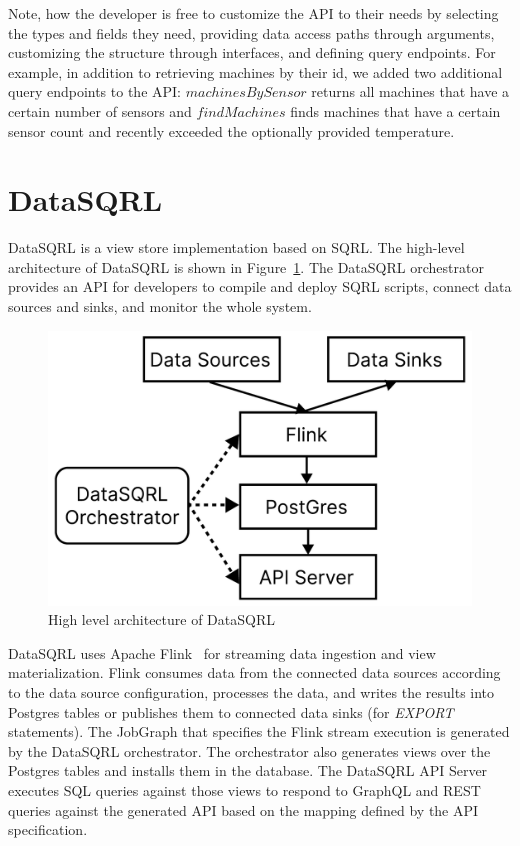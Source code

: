 \documentclass[	DIV=calc,%
							paper=letter,%
							fontsize=11pt,%
							twocolumn]{scrartcl}	 					%
\begin{document}
Note, how the developer is free to customize the API to their needs by selecting the types and fields they need, providing data access paths through arguments, customizing the structure through interfaces, and defining query endpoints. For example, in addition to retrieving machines by their id, we added two additional query endpoints to the API: $machinesBySensor$ returns all machines that have a certain number of sensors and $findMachines$ finds machines that have a certain sensor count and recently exceeded the optionally provided temperature.

\section{DataSQRL}
\label{sec:datasqrl}

DataSQRL is a view store implementation based on SQRL. The high-level architecture of DataSQRL is shown in Figure~\ref{fig:datasqrl_architecture}. The DataSQRL orchestrator provides an API for developers to compile and deploy SQRL scripts, connect data sources and sinks, and monitor the whole system.

\begin{figure}[h]
\includegraphics[width=\linewidth]{datasqrl_architecture.pdf}
\caption{High level architecture of DataSQRL}
\label{fig:datasqrl_architecture}
\end{figure}

DataSQRL uses Apache Flink~\cite{} for streaming data ingestion and view materialization. Flink consumes data from the connected data sources according to the data source configuration, processes the data, and writes the results into Postgres tables or publishes them to connected data sinks (for \emph{EXPORT} statements). The JobGraph that specifies the Flink stream execution is generated by the DataSQRL orchestrator. The orchestrator also generates views over the Postgres tables and installs them in the database. The DataSQRL API Server executes SQL queries against those views to respond to GraphQL and REST queries against the generated API based on the mapping defined by the API specification.
\end{document}
